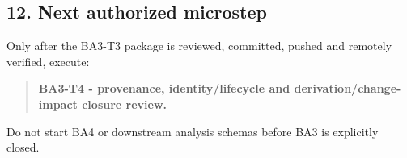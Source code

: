 \documentclass[11pt,a4paper]{article}
\begin{document}
\subsection{12. Next authorized
microstep}\label{next-authorized-microstep}

Only after the BA3-T3 package is reviewed, committed, pushed and
remotely verified, execute:

\begin{quote}
\textbf{BA3-T4 - provenance, identity/lifecycle and
derivation/change-impact closure review.}
\end{quote}

Do not start BA4 or downstream analysis schemas before BA3 is explicitly
closed.
\end{document}
